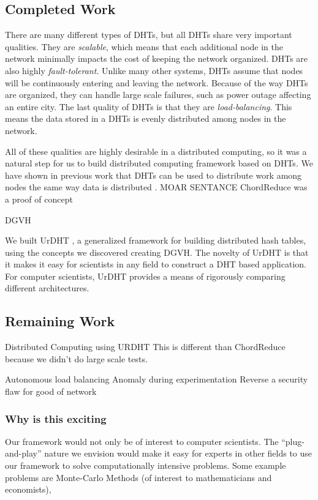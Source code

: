 \documentclass[12pt,a4paper]{article}
\begin{document}
\subsection*{Completed Work}

There are many different types of DHTs, but all DHTs share very important qualities.
They are \textit{scalable}, which means that each additional node in the network minimally impacts the cost of keeping the network organized.
DHTs are also highly \textit{fault-tolerant}.
Unlike many other systems, DHTs assume that nodes will be continuously entering and leaving the network.
Because of the way DHTs are organized, they can handle large scale failures, such as power outage affecting an entire city.
The last quality of DHTs is that they are  \textit{load-balancing}. 
This means the data stored in a DHTs is evenly distributed among nodes in the network.


All of these qualities are highly desirable in a distributed computing, so it was a natural step for us to build distributed computing framework based on DHTs.
We have shown in previous work that DHTs can be used to distribute work among nodes the same way data is distributed \cite{chordreduce}.
MOAR SENTANCE ChordReduce was a proof of concept

DGVH


We built UrDHT \cite{urdht}, a generalized framework for building distributed hash tables, using the concepts we discovered creating DGVH.
The novelty of UrDHT is that it makes it easy for scientists in any field to construct a DHT based application.
For computer scientists, UrDHT provides a means of rigorously comparing different architectures.

\subsection*{Remaining Work}

Distributed Computing using URDHT
This is different than ChordReduce because we didn't do large scale tests.


Autonomous load balancing
Anomaly during experimentation 
Reverse a security flaw for good of network


\subsubsection*{Why is this exciting }
Our framework would not only be of interest to computer scientists.
The ``plug-and-play'' nature we envision would make it easy for experts in other fields to use our framework to solve computationally intensive problems.
Some example problems are Monte-Carlo Methods (of interest to mathematicians and economists), 
\end{document}
